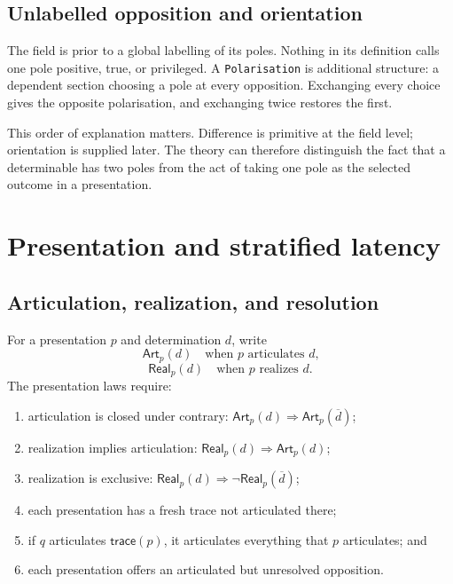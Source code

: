 \documentclass[11pt]{article}
\theoremstyle{definition}
\theoremstyle{remark}
\newcommand{\lean}[1]{\nolinkurl{#1}}
\newcommand{\Art}{\mathsf{Art}}
\newcommand{\Real}{\mathsf{Real}}
\newcommand{\Trace}{\mathsf{trace}}
\newcommand{\negd}[1]{\overline{#1}}
\begin{document}
\subsection{Unlabelled opposition and orientation}

The field is prior to a global labelling of its poles. Nothing in its
definition calls one pole positive, true, or privileged. A
\lean{Polarisation} is additional structure: a dependent section choosing a
pole at every opposition. Exchanging every choice gives the opposite
polarisation, and exchanging twice restores the first.

This order of explanation matters. Difference is primitive at the field level;
orientation is supplied later. The theory can therefore distinguish the fact
that a determinable has two poles from the act of taking one pole as the
selected outcome in a presentation.

\section{Presentation and stratified latency}

\subsection{Articulation, realization, and resolution}

For a presentation \(p\) and determination \(d\), write
\[
  \Art_p(d) \quad\text{when \(p\) articulates \(d\),}
\]
\[
  \Real_p(d) \quad\text{when \(p\) realizes \(d\).}
\]
The presentation laws require:

\begin{enumerate}[label=(P\arabic*)]
  \item articulation is closed under contrary:
        \(\Art_p(d)\Rightarrow\Art_p(\negd d)\);
  \item realization implies articulation:
        \(\Real_p(d)\Rightarrow\Art_p(d)\);
  \item realization is exclusive:
        \(\Real_p(d)\Rightarrow\neg\Real_p(\negd d)\);
  \item each presentation has a fresh trace not articulated there;
  \item if \(q\) articulates \(\Trace(p)\), it articulates everything that
        \(p\) articulates; and
  \item each presentation offers an articulated but unresolved opposition.
\end{enumerate}
\end{document}
